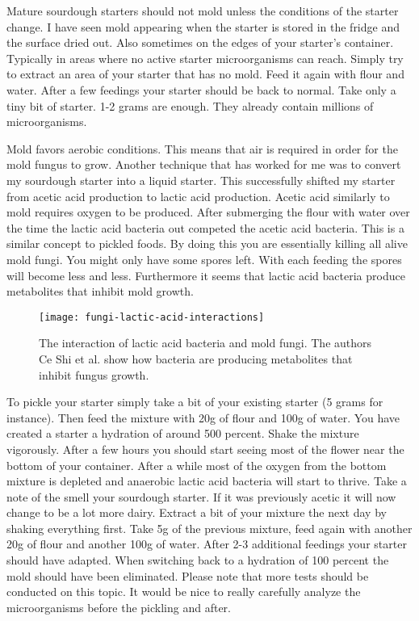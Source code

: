Mature sourdough starters should not mold unless the conditions
of the starter change. I have seen mold appearing when the starter is stored
in the fridge and the surface dried out. Also sometimes on the
edges of your starter's container. Typically in areas where no active
starter microorganisms can reach. Simply try to extract an
area of your starter that has no mold. Feed it again with flour and
water. After a few feedings your starter should be back to normal.
Take only a tiny bit of starter. 1-2 grams are enough. They already
contain millions of microorganisms.

Mold favors aerobic conditions. This means that air is required in order
for the mold fungus to grow. Another technique that has worked for me
was to convert my sourdough starter into a liquid starter. This successfully
shifted my starter from acetic acid production to lactic acid production.
Acetic acid similarly to mold requires oxygen to be produced. After
submerging the flour with water over the time the lactic acid bacteria
out competed the acetic acid bacteria. This is a similar concept to pickled
foods. By doing this you are essentially killing all alive mold fungi. You
might only have some spores left. With each feeding the spores will become
less and less. Furthermore it seems that lactic acid bacteria produce
metabolites that inhibit mold growth. \cite{mold+lactic+acid+bacteria}

\begin{figure}[!htb]
  \texttt{[image: fungi-lactic-acid-interactions]}
  \caption{The interaction of lactic acid bacteria and mold fungi.
           The authors Ce Shi et al. show how bacteria are producing
           metabolites that inhibit fungus growth. \cite{mold+lactic+acid+bacteria}}
  \label{fig:fungi-lactic-acid-interactions}
\end{figure}

To pickle your starter simply take a bit of your existing starter (5 grams for
instance). Then feed the mixture with 20g of flour and 100g of water. You have
created a starter a hydration of around 500 percent. Shake the mixture vigorously.
After a few hours you should start seeing most of the flower near the bottom
of your container. After a while most of the oxygen from the bottom mixture
is depleted and anaerobic lactic acid bacteria will start to thrive. Take a
note of the smell your sourdough starter. If it was previously acetic
it will now change to be a lot more dairy. Extract a bit of your mixture the
next day by shaking everything first. Take 5g of the previous mixture, feed
again with another 20g of flour and another 100g of water. After 2-3
additional feedings your starter should have adapted. When switching back
to a hydration of 100 percent the mold should have been eliminated. Please note that
more tests should be conducted on this topic. It would be nice to really
carefully analyze the microorganisms before the pickling and after.

